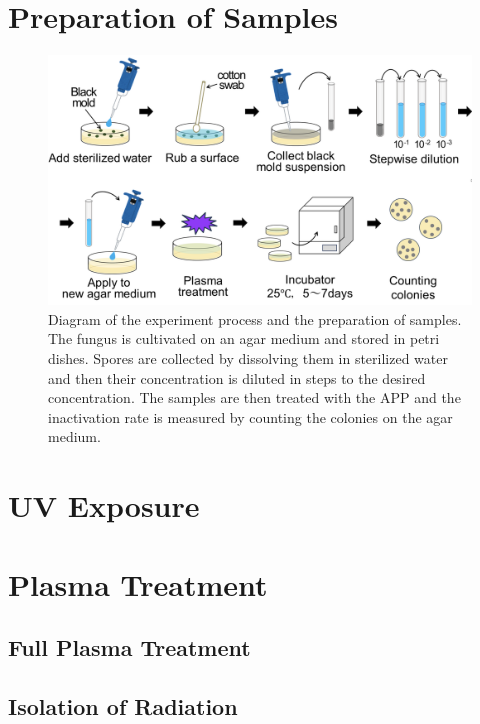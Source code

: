 \section{Preparation of Samples}
\begin{figure}
    \centering
    \includegraphics[width=1\textwidth]{images/Process.png}
    \caption[Diagram of the experiment process]{Diagram of the experiment process and the preparation of samples. The fungus is cultivated on an agar medium and stored in petri dishes. Spores are collected by dissolving them in sterilized water and then their concentration is diluted in steps to the desired concentration. The samples are then treated with the APP and the inactivation rate is measured by counting the colonies on the agar medium.}
    \label{fig:process}
\end{figure}

\section{UV Exposure}

\section{Plasma Treatment}

\subsection{Full Plasma Treatment}
\subsection{Isolation of Radiation}


